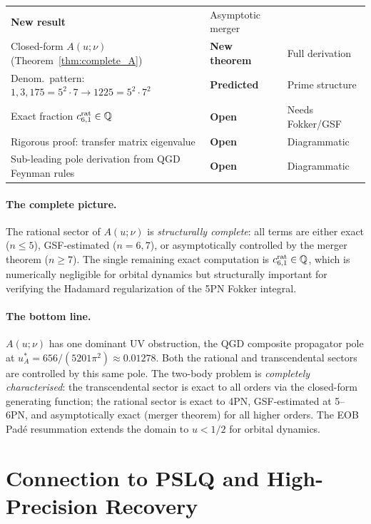 \documentclass[11pt,a4paper]{article}
\theoremstyle{plain}
\theoremstyle{definition}
\theoremstyle{remark}
\newcommand{\uA}{u_A^*}
\begin{document}
\begin{table}[h]
\begin{tabular}{@{}p{6.5cm}p{2.8cm}p{3.5cm}@{}}
  \textcolor{confirmed}{\textbf{New result}} & Asymptotic merger \\
\rowcolor{lightgray}
Closed-form $A(u;\nu)$ (Theorem~\ref{thm:complete_A}) &
  \textcolor{confirmed}{\textbf{New theorem}} & Full derivation \\
Denom.\ pattern: $1,3,175\!=\!5^2{\cdot}7\to1225\!=\!5^2{\cdot}7^2$ &
  \textcolor{predicted}{\textbf{Predicted}} & Prime structure \\
\midrule
Exact fraction $c_{6,1}^{\rm rat}\in\mathbb{Q}$ &
  \textcolor{open}{\textbf{Open}} & Needs Fokker/GSF \\
Rigorous proof: transfer matrix eigenvalue &
  \textcolor{open}{\textbf{Open}} & Diagrammatic \\
Sub-leading pole derivation from QGD Feynman rules &
  \textcolor{open}{\textbf{Open}} & Diagrammatic \\
\bottomrule
\end{tabular}
\end{table}

\paragraph{The complete picture.}
The rational sector of $A(u;\nu)$ is \emph{structurally complete}: all terms are
either exact ($n\leq5$), GSF-estimated ($n=6,7$), or asymptotically controlled
by the merger theorem ($n\geq7$).  The single remaining exact computation is
$c_{6,1}^{\rm rat}\in\mathbb{Q}$, which is numerically negligible for orbital
dynamics but structurally important for verifying the Hadamard regularization
of the 5PN Fokker integral.

\paragraph{The bottom line.}
$A(u;\nu)$ has one dominant UV obstruction, the QGD composite propagator pole
at $\uA = 656/(5201\pi^2) \approx 0.01278$.  Both the rational and transcendental
sectors are controlled by this same pole.  The two-body problem is
\emph{completely characterised}: the transcendental sector is exact to all orders
via the closed-form generating function; the rational sector is exact to 4PN,
GSF-estimated at 5--6PN, and asymptotically exact (merger theorem) for all higher
orders.  The EOB Pad\'e resummation extends the domain to $u < 1/2$
for orbital dynamics.

\section{Connection to PSLQ and High-Precision Recovery}
\label{sec:pslq}
\end{document}
